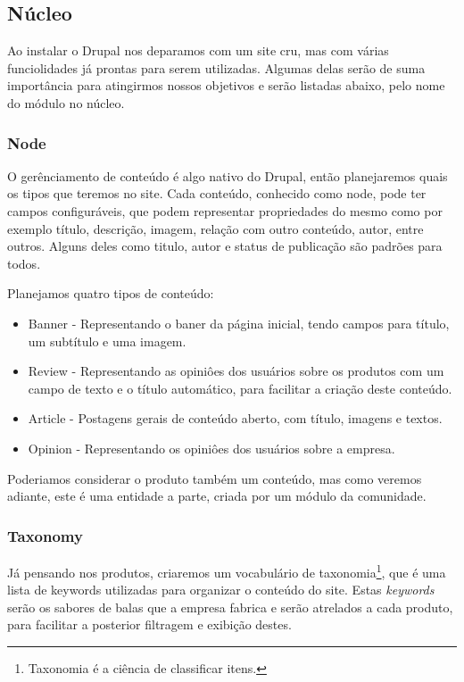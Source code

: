 \subsection{Núcleo}

Ao instalar o Drupal nos deparamos com um site cru, mas com várias funciolidades já prontas para serem utilizadas. Algumas delas serão de suma importância para atingirmos nossos objetivos e serão listadas abaixo, pelo nome do módulo no núcleo.

\subsubsection{Node}
O gerênciamento de conteúdo é algo nativo do Drupal, então planejaremos quais os tipos que teremos no site. Cada conteúdo, conhecido como node, pode ter campos configuráveis, que podem representar propriedades do mesmo como por exemplo título, descrição, imagem, relação com outro conteúdo, autor, entre outros. Alguns deles como titulo, autor e status de publicação são padrões para todos.

Planejamos quatro tipos de conteúdo:
\begin{itemize}
  \item Banner - Representando o baner da página inicial, tendo campos para título, um subtítulo e uma imagem.
  \item Review - Representando as opiniôes dos usuários sobre os produtos com um campo de texto e o título automático, para facilitar a criação deste conteúdo.
  \item Article - Postagens gerais de conteúdo aberto, com título, imagens e textos.
  \item Opinion - Representando os opiniôes dos usuários sobre a empresa.
\end{itemize}

Poderiamos considerar o produto também um conteúdo, mas como veremos adiante, este é uma entidade a parte, criada por um módulo da comunidade.

\subsubsection{Taxonomy}
Já pensando nos produtos, criaremos um vocabulário de taxonomia\footnote{Taxonomia é a ciência de classificar itens.}, que é uma lista de keywords utilizadas para organizar o conteúdo do site. Estas \textit{keywords} serão os sabores de balas que a empresa fabrica e serão atrelados a cada produto, para facilitar a posterior filtragem e exibição destes.

